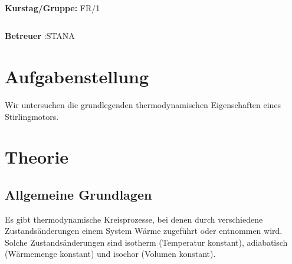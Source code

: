 \documentclass[12pt,a4paper,twopage]{article}
\begin{document}
\begin{verbatim}


\end{verbatim}
			\begin{flushleft}
			\textbf{\Large{Kurstag/Gruppe:}} \Large{FR/1}
			\end{flushleft}

\begin{verbatim}

\end{verbatim}
			\begin{flushleft}
			\LARGE{\textbf{Betreuer }:\Large{STANA }}		
			\end{flushleft}
			
\section{Aufgabenstellung}
Wir untersuchen die grundlegenden thermodynamischen Eigenschaften eines Stirlingmotors.
\section{Theorie}
\subsection{Allgemeine Grundlagen}
Es gibt thermodynamische Kreisprozesse, bei denen durch verschiedene Zustandsänderungen einem System Wärme zugeführt oder entnommen wird. Solche Zustandsänderungen sind isotherm (Temperatur konstant), adiabatisch (Wärmemenge konstant) und isochor (Volumen konstant).
\end{document}
